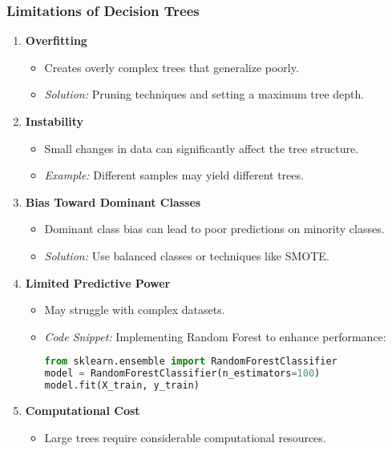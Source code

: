 \documentclass[aspectratio=169]{beamer}
\begin{document}
\begin{frame}[fragile]
    \frametitle{Limitations of Decision Trees}
    \begin{enumerate}
        \item \textbf{Overfitting}  
        \begin{itemize}
            \item Creates overly complex trees that generalize poorly.
            \item \textit{Solution:} Pruning techniques and setting a maximum tree depth.
        \end{itemize}

        \item \textbf{Instability}  
        \begin{itemize}
            \item Small changes in data can significantly affect the tree structure.
            \item \textit{Example:} Different samples may yield different trees.
        \end{itemize}

        \item \textbf{Bias Toward Dominant Classes}  
        \begin{itemize}
            \item Dominant class bias can lead to poor predictions on minority classes.
            \item \textit{Solution:} Use balanced classes or techniques like SMOTE.
        \end{itemize}

        \item \textbf{Limited Predictive Power}  
        \begin{itemize}
            \item May struggle with complex datasets.
            \item \textit{Code Snippet:} Implementing Random Forest to enhance performance:
            \begin{lstlisting}[language=python]
from sklearn.ensemble import RandomForestClassifier
model = RandomForestClassifier(n_estimators=100)
model.fit(X_train, y_train)
            \end{lstlisting}
        \end{itemize}

        \item \textbf{Computational Cost}  
        \begin{itemize}
            \item Large trees require considerable computational resources.
        \end{itemize}
    \end{enumerate}
\end{frame}
\end{document}
